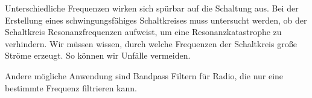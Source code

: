%
%
Unterschiedliche Frequenzen wirken sich spürbar auf die Schaltung aus. Bei der Erstellung eines schwingungsfähiges Schaltkreises muss untersucht werden, ob der Schaltkreis Resonanzfrequenzen aufweist, um eine Resonanzkatastrophe zu verhindern. Wir müssen wissen, durch welche Frequenzen der Schaltkreis große Ströme erzeugt. So können wir Unfälle vermeiden.

Andere mögliche Anwendung sind Bandpass Filtern für Radio, die nur eine bestimmte Frequenz filtrieren kann.
%
%
%
\begin{flushright}
  \textit{\autorA}
\end{flushright}
%
%
%
%